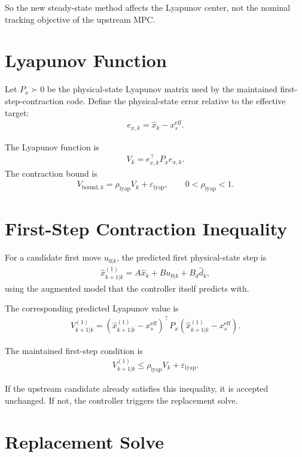 \documentclass[11pt]{article}
\begin{document}
So the new steady-state method affects the Lyapunov center, not the nominal tracking objective of the upstream MPC.

\section{Lyapunov Function}

Let $P_x \succ 0$ be the physical-state Lyapunov matrix used by the maintained first-step-contraction code. Define the physical-state error relative to the effective target:
\begin{align}
e_{x,k} = \hat x_k - x_s^{\mathrm{eff}}.
\end{align}

The Lyapunov function is
\begin{align}
V_k = e_{x,k}^\top P_x e_{x,k}.
\end{align}
The contraction bound is
\begin{align}
V_{\mathrm{bound},k} = \rho_{\mathrm{lyap}} V_k + \varepsilon_{\mathrm{lyap}},
\qquad
0 < \rho_{\mathrm{lyap}} < 1.
\end{align}

\section{First-Step Contraction Inequality}

For a candidate first move $u_{0|k}$, the predicted first physical-state step is
\begin{align}
\hat x_{k+1|k}^{(1)} = A \hat x_k + B u_{0|k} + B_d \hat d_k,
\end{align}
using the augmented model that the controller itself predicts with.

The corresponding predicted Lyapunov value is
\begin{align}
V_{k+1|k}^{(1)}
=
(\hat x_{k+1|k}^{(1)} - x_s^{\mathrm{eff}})^\top
P_x
(\hat x_{k+1|k}^{(1)} - x_s^{\mathrm{eff}}).
\end{align}

The maintained first-step condition is
\begin{align}
V_{k+1|k}^{(1)} \le \rho_{\mathrm{lyap}} V_k + \varepsilon_{\mathrm{lyap}}.
\end{align}

If the upstream candidate already satisfies this inequality, it is accepted unchanged. If not, the controller triggers the replacement solve.

\section{Replacement Solve}
\end{document}
